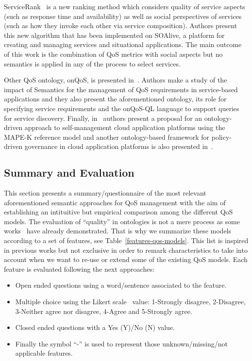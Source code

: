 ServiceRank~\cite{Wu:2009:CQS:1696051.1696105} is a new ranking method which 
considers quality of service aspects (such as response time and availability) as 
well as social perspectives of services (such as how they invoke each other via 
service composition). Authors present this new algorithm that has been 
implemented on SOAlive, a platform for creating and managing services and 
situational applications. The main outcome of this work is the combination of 
QoS metrics with social aspects but no semantics is applied in any of the 
process to select services. 

Other QoS ontology, onQoS, is presented in~\cite{Damiano:2009:OQL:1506129.1506143}. Authors make a study of the impact of 
Semantics for the management of QoS requirements in service-based 
applications and they also present the aforementioned ontology, its role for 
specifying service requirements and the onQoS-QL language to support queries for 
service discovery. Finally, in~\cite{Dautov:2013:ASC:2462307.2462312} authors present a proposal for an 
ontology-driven approach to self-management cloud application platforms using 
the MAPE-K reference model and another ontology-based framework for policy-driven 
governance in cloud application platforms is also presented 
in~\cite{DBLP:conf/icsoc/KourtesisP11}.

\subsection{Summary and Evaluation}
This section presents a summary/questionnaire of the most relevant aforementioned semantic approaches for QoS management 
with the aim of establishing an intituitive  but empirical comparison among the different QoS models. 
The evaluation of ``quality'' in ontologies is not a mere process as some works~\cite{DBLP:conf/dexa/dAquinSSS07,DBLP:conf/nldb/SabouFM09,Brank05asurvey} 
have already demonstrated. That is why we summarize these models according to a set of features, see Table~\ref{features-qos-models}. 
This list is inspired in previous works but not exclusive in order to remark characteristics 
to take into account when we want to re-use or extend some of the existing QoS models. 
Each feature is evaluated following the next approaches:
\begin{itemize}
 \item Open ended questions using a word/sentence associated to the feature.
 \item Multiple choice using the Likert scale~\cite{albaum1997likert} value: 1-Strongly disagree, 2-Disagree, 3-Neither agree nor disagree, 4-Agree and 5-Strongly agree.
 \item Closed ended questions with a Yes (Y)/No (N) value. 
 \item Finally the symbol ``-'' is used to represent those unknown/missing/not applicable features.
\end{itemize}


